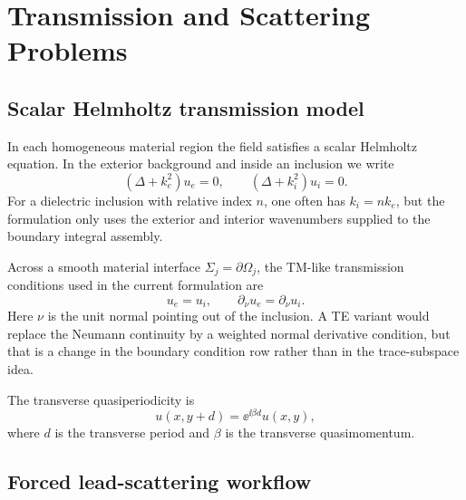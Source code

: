 %
%
%
%
%

\section{Transmission and Scattering Problems}

\subsection{Scalar Helmholtz transmission model}

In each homogeneous material region the field satisfies a scalar Helmholtz
equation.  In the exterior background and inside an inclusion we write
\[
  (\Delta+k_e^2)u_e=0,
  \qquad
  (\Delta+k_i^2)u_i=0 .
\]
For a dielectric inclusion with relative index \(n\), one often has
\(k_i=nk_e\), but the formulation only uses the exterior and interior
wavenumbers supplied to the boundary integral assembly.

Across a smooth material interface \(\Sigma_j=\partial\Omega_j\), the TM-like
transmission conditions used in the current formulation are
\[
  u_e=u_i,
  \qquad
  \partial_\nu u_e=\partial_\nu u_i .
\]
Here \(\nu\) is the unit normal pointing out of the inclusion.  A TE variant
would replace the Neumann continuity by a weighted normal derivative condition,
but that is a change in the boundary condition row rather than in the
trace-subspace idea.

The transverse quasiperiodicity is
\[
  u(x,y+d)=\ee^{\ii\beta d}u(x,y),
\]
where \(d\) is the transverse period and \(\beta\) is the transverse
quasimomentum.

\subsection{Forced lead-scattering workflow}

